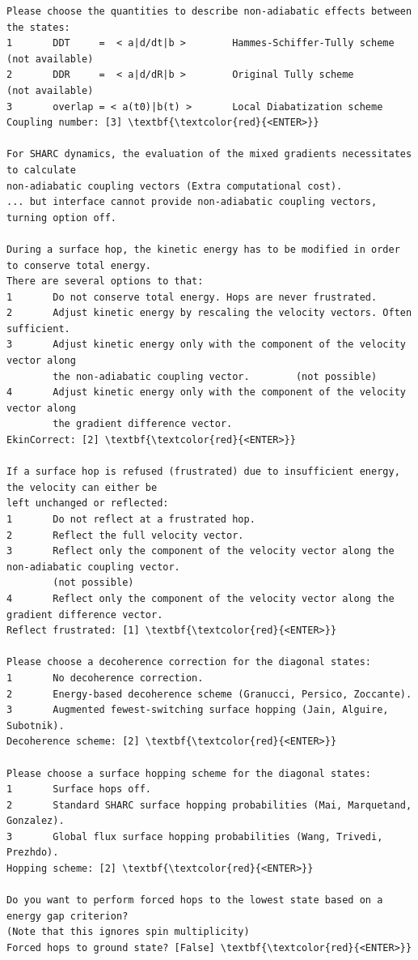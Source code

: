 \documentclass[a4paper,11pt,DIV=15,openany]{scrbook}
\begin{document}
\begin{oframed}
\begin{Verbatim}[commandchars=\\\{\}]
Please choose the quantities to describe non-adiabatic effects between the states:
1       DDT     =  < a|d/dt|b >        Hammes-Schiffer-Tully scheme   (not available)
2       DDR     =  < a|d/dR|b >        Original Tully scheme          (not available)
3       overlap = < a(t0)|b(t) >       Local Diabatization scheme     
Coupling number: [3] \textbf{\textcolor{red}{<ENTER>}}

For SHARC dynamics, the evaluation of the mixed gradients necessitates to calculate 
non-adiabatic coupling vectors (Extra computational cost).
... but interface cannot provide non-adiabatic coupling vectors, turning option off.

During a surface hop, the kinetic energy has to be modified in order to conserve total energy. 
There are several options to that:
1       Do not conserve total energy. Hops are never frustrated.
2       Adjust kinetic energy by rescaling the velocity vectors. Often sufficient.
3       Adjust kinetic energy only with the component of the velocity vector along 
        the non-adiabatic coupling vector.        (not possible)
4       Adjust kinetic energy only with the component of the velocity vector along
        the gradient difference vector.
EkinCorrect: [2] \textbf{\textcolor{red}{<ENTER>}}

If a surface hop is refused (frustrated) due to insufficient energy, the velocity can either be 
left unchanged or reflected:
1       Do not reflect at a frustrated hop.
2       Reflect the full velocity vector.
3       Reflect only the component of the velocity vector along the non-adiabatic coupling vector.
        (not possible)
4       Reflect only the component of the velocity vector along the gradient difference vector.
Reflect frustrated: [1] \textbf{\textcolor{red}{<ENTER>}}

Please choose a decoherence correction for the diagonal states:
1       No decoherence correction.
2       Energy-based decoherence scheme (Granucci, Persico, Zoccante).
3       Augmented fewest-switching surface hopping (Jain, Alguire, Subotnik).
Decoherence scheme: [2] \textbf{\textcolor{red}{<ENTER>}}

Please choose a surface hopping scheme for the diagonal states:
1       Surface hops off.
2       Standard SHARC surface hopping probabilities (Mai, Marquetand, Gonzalez).
3       Global flux surface hopping probabilities (Wang, Trivedi, Prezhdo).
Hopping scheme: [2] \textbf{\textcolor{red}{<ENTER>}}

Do you want to perform forced hops to the lowest state based on a energy gap criterion?
(Note that this ignores spin multiplicity)
Forced hops to ground state? [False] \textbf{\textcolor{red}{<ENTER>}}


\end{Verbatim}
\end{oframed}
\end{document}
